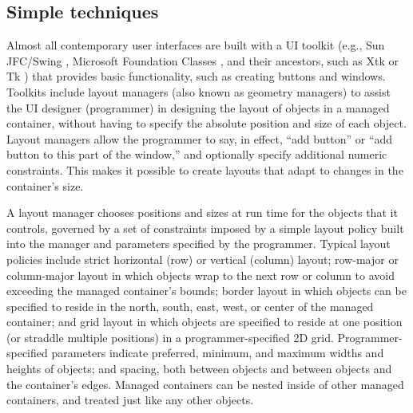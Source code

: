    \subsection{Simple techniques}
    \label{simple-techniques}

    Almost all contemporary user interfaces are built with a UI toolkit (e.g.,
    Sun JFC/Swing \citep{sun-1}, Microsoft Foundation Classes
    \citep{microsoft-1}, and their ancestors, such as Xtk \citep{mccormack-1}
    or Tk \citep{ousterhout-1}) that provides basic functionality, such as
    creating buttons and windows. Toolkits include layout managers (also known
    as geometry managers) to assist the UI designer (programmer) in designing
    the layout of objects in a managed container, without having to specify the
    absolute position and size of each object. Layout managers allow the
    programmer to say, in effect, “add button” or “add button to this part of
    the window,” and optionally specify additional numeric constraints. This
    makes it possible to create layouts that adapt to changes in the
    container’s size.

    A layout manager chooses positions and sizes at run time for the objects
    that it controls, governed by a set of constraints imposed by a simple
    layout policy built into the manager and parameters specified by the
    programmer. Typical layout policies include strict horizontal (row) or
    vertical (column) layout; row-major or column-major layout in which objects
    wrap to the next row or column to avoid exceeding the managed container’s
    bounds; border layout in which objects can be specified to reside in the
    north, south, east, west, or center of the managed container; and grid
    layout in which objects are specified to reside at one position (or
    straddle multiple positions) in a programmer-specified 2D grid.
    Programmer-specified parameters indicate preferred, minimum, and maximum
    widths and heights of objects; and spacing, both between objects and
    between objects and the container’s edges. Managed containers can be nested
    inside of other managed containers, and treated just like any other
    objects.

